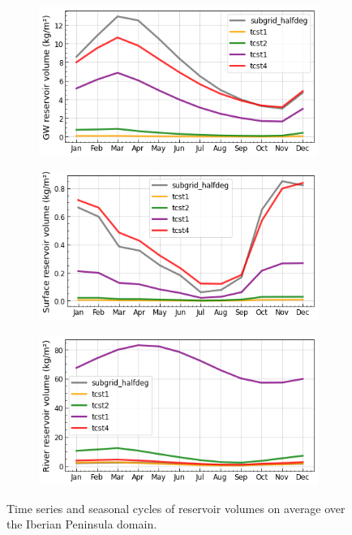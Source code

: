\begin{figure}[htbp]
    \begin{subfigure}[b]{0.32\textwidth}
        \caption{}
        \includegraphics[width=\linewidth]{images/eval_halfdeg/time_series/slowr_seasonal_cycle_tcsts.png}
    \end{subfigure}
    \begin{subfigure}[b]{0.32\textwidth}
        \caption{}
        \includegraphics[width=\linewidth]{images/eval_halfdeg/time_series/fastr_seasonal_cycle_tcsts.png}
    \end{subfigure}
    \begin{subfigure}[b]{0.32\textwidth}
        \caption{}
        \includegraphics[width=\linewidth]{images/eval_halfdeg/time_series/streamr_seasonal_cycle_tcsts.png}
    \end{subfigure}
    \caption{Time series and seasonal cycles of reservoir volumes on average over the Iberian Peninsula domain.}
    \label{fig:reservoir_time_series_tcsts}
\end{figure}


